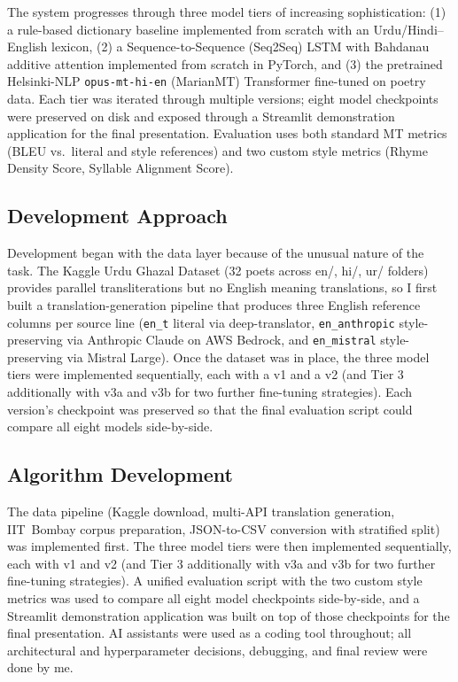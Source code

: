 \documentclass[11pt]{article}
\begin{document}
The system progresses through three model tiers of increasing sophistication: (1) a rule-based dictionary baseline implemented from scratch with an Urdu/Hindi--English lexicon, (2) a Sequence-to-Sequence (Seq2Seq) LSTM with Bahdanau additive attention implemented from scratch in PyTorch, and (3) the pretrained Helsinki-NLP \texttt{opus-mt-hi-en} (MarianMT) Transformer fine-tuned on poetry data. Each tier was iterated through multiple versions; eight model checkpoints were preserved on disk and exposed through a Streamlit demonstration application for the final presentation. Evaluation uses both standard MT metrics (BLEU vs.\ literal and style references) and two custom style metrics (Rhyme Density Score, Syllable Alignment Score).

\subsection{Development Approach}
Development began with the data layer because of the unusual nature of the task. The Kaggle Urdu Ghazal Dataset (32 poets across en/, hi/, ur/ folders) provides parallel transliterations but no English meaning translations, so I first built a translation-generation pipeline that produces three English reference columns per source line (\texttt{en\_t} literal via deep-translator, \texttt{en\_anthropic} style-preserving via Anthropic Claude on AWS Bedrock, and \texttt{en\_mistral} style-preserving via Mistral Large). Once the dataset was in place, the three model tiers were implemented sequentially, each with a v1 and a v2 (and Tier 3 additionally with v3a and v3b for two further fine-tuning strategies). Each version's checkpoint was preserved so that the final evaluation script could compare all eight models side-by-side.

\subsection{Algorithm Development}
The data pipeline (Kaggle download, multi-API translation generation, IIT~Bombay corpus preparation, JSON-to-CSV conversion with stratified split) was implemented first. The three model tiers were then implemented sequentially, each with v1 and v2 (and Tier 3 additionally with v3a and v3b for two further fine-tuning strategies). A unified evaluation script with the two custom style metrics was used to compare all eight model checkpoints side-by-side, and a Streamlit demonstration application was built on top of those checkpoints for the final presentation. AI assistants were used as a coding tool throughout; all architectural and hyperparameter decisions, debugging, and final review were done by me.
\end{document}
